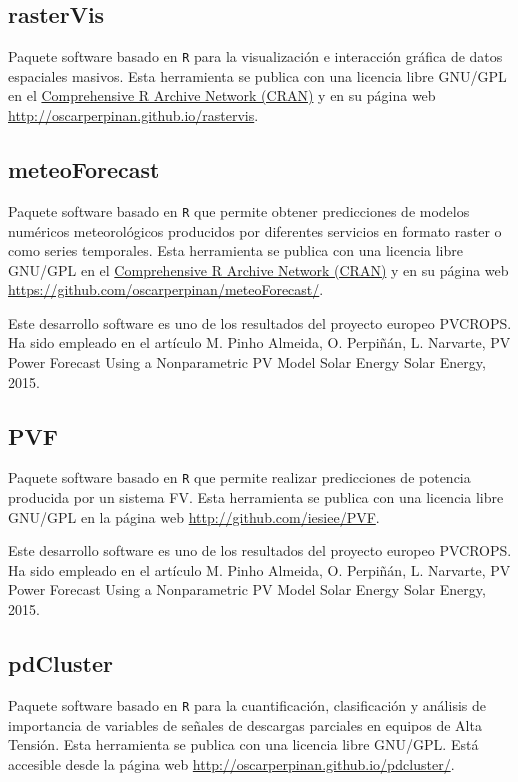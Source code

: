 \documentclass[article, a4paper]{memoir}
\begin{document}
\subsection{rasterVis}
\label{sec-10-2}
Paquete software basado en \texttt{R} para la visualización e interacción gráfica de datos espaciales masivos. Esta herramienta se publica con una licencia libre GNU/GPL en el \href{http://cran.r-project.org/web/packages/rasterVis/index.html}{Comprehensive R Archive Network (CRAN)} y en su página web \url{http://oscarperpinan.github.io/rastervis}.

\subsection{meteoForecast}
\label{sec-10-3}
Paquete software basado en \texttt{R} que permite obtener predicciones de modelos numéricos meteorológicos producidos por diferentes servicios en formato raster o como series temporales. Esta herramienta se publica con una licencia libre GNU/GPL en el \href{http://cran.r-project.org/web/packages/meteoForecast/index.html}{Comprehensive R Archive Network (CRAN)} y en su página web \url{https://github.com/oscarperpinan/meteoForecast/}.

Este desarrollo software es uno de los resultados del proyecto europeo PVCROPS. Ha sido empleado en el artículo M. Pinho Almeida, O. Perpiñán, L. Narvarte, \guillemotleft{}PV Power Forecast Using a Nonparametric PV Model Solar Energy\guillemotright{} Solar Energy, 2015. 

\subsection{PVF}
\label{sec-10-4}
Paquete software basado en \texttt{R} que permite realizar predicciones de potencia producida por un sistema FV. Esta herramienta se publica con una licencia libre GNU/GPL en la página web \url{http://github.com/iesiee/PVF}.

Este desarrollo software es uno de los resultados del proyecto europeo PVCROPS. Ha sido empleado en el artículo M. Pinho Almeida, O. Perpiñán, L. Narvarte, \guillemotleft{}PV Power Forecast Using a Nonparametric PV Model Solar Energy\guillemotright{} Solar Energy, 2015. 

\subsection{pdCluster}
\label{sec-10-5}
Paquete software basado en \texttt{R} para la cuantificación, clasificación y análisis de importancia de variables de señales de descargas parciales en equipos de Alta Tensión. Esta herramienta se publica con una licencia libre GNU/GPL. Está accesible desde la página web \url{http://oscarperpinan.github.io/pdcluster/}.
\end{document}
